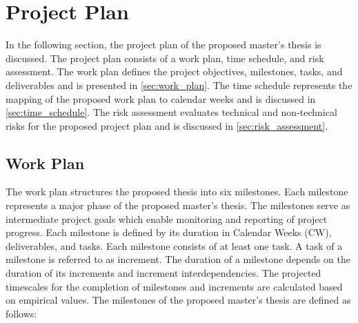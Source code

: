 \chapter{Project Plan}
\label{ch:project_plan}
In the following section, the project plan of the proposed master's thesis is discussed.
The project plan consists of a work plan, time schedule, and risk assessment.
The work plan defines the project objectives, milestones, tasks, and deliverables and is presented in \autoref{sec:work_plan}.
The time schedule represents the mapping of the proposed work plan to calendar weeks and is discussed in \autoref{sec:time_schedule}.
The risk assessment evaluates technical and non-technical risks for the proposed project plan and is discussed in \autoref{sec:risk_assessment}.

\section{Work Plan}
\label{sec:work_plan}
The work plan structures the proposed thesis into six milestones.
Each milestone represents a major phase of the proposed master's thesis.
The milestones serve as intermediate project goals which enable monitoring and reporting of project progress.
Each milestone is defined by its duration in Calendar Weeks (CW), deliverables, and tasks.
Each milestone consists of at least one task.
A task of a milestone is referred to as increment.
The duration of a milestone depends on the duration of its increments and increment interdependencies.
The projected timescales for the completion of milestones and increments are calculated based on empirical values.
The milestones of the proposed master's thesis are defined as follows:
